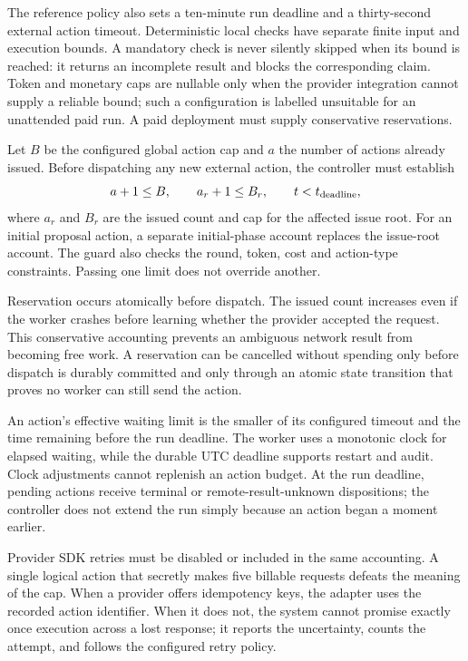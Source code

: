 \documentclass[12pt,a4paper,oneside,openany]{book}
\begin{document}
The reference policy also sets a ten-minute run deadline and a thirty-second
external action timeout. Deterministic local checks have separate finite input
and execution bounds. A mandatory check is never silently skipped when its bound
is reached: it returns an incomplete result and blocks the corresponding claim.
Token and monetary caps are nullable only when the provider integration cannot
supply a reliable bound; such a configuration is labelled unsuitable for an
unattended paid run. A paid deployment must supply conservative reservations.

Let $B$ be the configured global action cap and $a$ the number of actions already
issued. Before dispatching any new external action, the controller must establish
\begin{equation}
 a+1\leq B,\qquad a_r+1\leq B_r,\qquad t<t_{\rm deadline},
 \label{eq:budget-guard}
\end{equation}
where $a_r$ and $B_r$ are the issued count and cap for the affected issue root.
For an initial proposal action, a separate initial-phase account replaces the
issue-root account. The guard also checks the round, token, cost and action-type
constraints. Passing one limit does not override another.

Reservation occurs atomically before dispatch. The issued count increases even if
the worker crashes before learning whether the provider accepted the request.
This conservative accounting prevents an ambiguous network result from becoming
free work. A reservation can be cancelled without spending only before dispatch
is durably committed and only through an atomic state transition that proves no
worker can still send the action.

An action's effective waiting limit is the smaller of its configured timeout
and the time remaining before the run deadline. The worker uses a monotonic clock
for elapsed waiting, while the durable UTC deadline supports restart and audit.
Clock adjustments cannot replenish an action budget. At the run deadline, pending
actions receive terminal or remote-result-unknown dispositions; the controller
does not extend the run simply because an action began a moment earlier.

Provider SDK retries must be disabled or included in the same accounting. A
single logical action that secretly makes five billable requests defeats the
meaning of the cap. When a provider offers idempotency keys, the adapter uses the
recorded action identifier. When it does not, the system cannot promise exactly
once execution across a lost response; it reports the uncertainty, counts the
attempt, and follows the configured retry policy.
\end{document}
